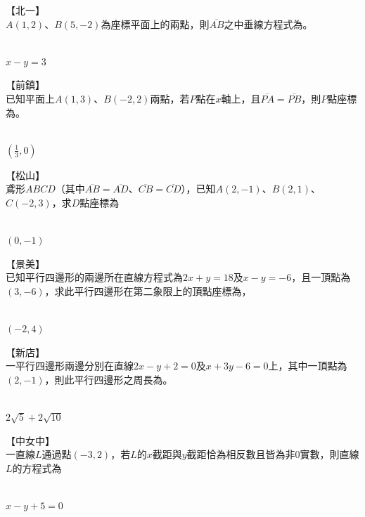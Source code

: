 \documentclass
[answers]
{exam}
\newcommand\ul[1]{\uline{\hspace*{#1}}}
\theoremstyle{definition}
\begin{document}
\begin{questions}
\question
【北一】\\
$A\left( 1,2\right)$、$B\left( 5,-2\right)$為座標平面上的兩點，則$\overline{AB}$之中垂線方程式為\ul{50pt}。

\begin{solution}~\\
	$x-y=3$
\end{solution}

\question
【前鎮】\\
已知平面上$A\left( 1,3\right)$、$B\left( -2,2\right)$兩點，若$P$點在$x$軸上，且$\overline{PA}=\overline{PB}$，則$P$點座標為\ul{50pt}。

\begin{solution}~\\
	$\left( \frac{1}{3} ,0\right)$
\end{solution}

\question
【松山】\\
鳶形$ABCD$（其中$\overline{AB}=\overline{AD}$、$\overline{CB}=\overline{CD}$），已知$A\left( 2,-1\right)$、$B\left( 2,1\right)$、$C\left( -2,3\right)$，求$D$點座標為\ul{50pt}
\begin{solution}~\\
	$\left( 0,-1 \right)$
\end{solution}

\question
【景美】\\
已知平行四邊形的兩邊所在直線方程式為$2x+y=18$及$x-y=-6$，且一頂點為$\left( 3,-6\right)$，求此平行四邊形在第二象限上的頂點座標為\ul{50pt}，
\begin{solution}~\\
	$\left( -2,4 \right)$
\end{solution}

\question
【新店】\\
一平行四邊形兩邊分別在直線$2x-y+2=0$及$x+3y-6=0$上，其中一頂點為$\left( 2,-1\right)$，則此平行四邊形之周長為\ul{50pt}。
\begin{solution}~\\
	$2\sqrt{5}+2\sqrt{10}$
\end{solution}

\question
【中女中】\\
一直線$L$通過點$\left( -3,2\right)$，若$L$的$x$截距與$y$截距恰為相反數且皆為非0實數，則直線$L$的方程式為\ul{50pt}
\begin{solution}~\\
	$x-y+5=0$
\end{solution}



\end{questions}
\end{document}
